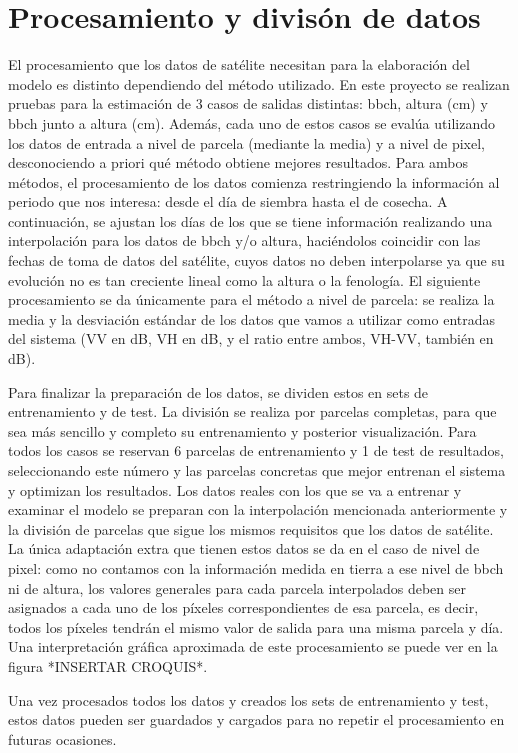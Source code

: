 \section{Procesamiento y divisón de datos}
\par  El procesamiento que los datos de satélite necesitan para la elaboración del modelo es distinto dependiendo del método utilizado. En este proyecto se realizan pruebas para la estimación de 3 casos de salidas distintas: \gls{bbch}, altura (cm) y \gls{bbch} junto a altura (cm). Además, cada uno de estos casos se evalúa utilizando los datos de entrada a nivel de parcela (mediante la media) y a nivel de pixel, desconociendo a priori qué método obtiene mejores resultados. Para ambos métodos, el procesamiento de los datos comienza restringiendo la información al periodo que nos interesa: desde el día de siembra hasta el de cosecha. A continuación, se ajustan los días de los que se tiene información realizando una interpolación para los datos de \gls{bbch} y/o altura, haciéndolos coincidir con las fechas de toma de datos del satélite, cuyos datos no deben interpolarse ya que su evolución no es tan creciente lineal como la altura o la fenología. El siguiente procesamiento se da únicamente para el método a nivel de parcela: se realiza la media y la desviación estándar de los datos que vamos a utilizar como entradas del sistema (VV en dB, VH en dB, y el ratio entre ambos, VH-VV, también en dB). 
\\
\par Para finalizar la preparación de los datos, se dividen estos en sets de entrenamiento y de test. La división se realiza por parcelas completas, para que sea más sencillo y completo su entrenamiento y posterior visualización. Para todos los casos se reservan 6 parcelas de entrenamiento y 1 de test de resultados, seleccionando este número y las parcelas concretas que mejor entrenan el sistema y optimizan los resultados. Los datos reales con los que se va a entrenar y examinar el modelo se preparan con la interpolación mencionada anteriormente y la división de parcelas que sigue los mismos requisitos que los datos de satélite. La única adaptación extra que tienen estos datos se da en el caso de nivel de pixel: como no contamos con la información medida en tierra a ese nivel de \gls{bbch} ni de altura, los valores generales para cada parcela interpolados deben ser asignados a cada uno de los píxeles correspondientes de esa parcela, es decir, todos los píxeles tendrán el mismo valor de salida para una misma parcela y día. Una interpretación gráfica aproximada de este procesamiento se puede ver en la figura *INSERTAR CROQUIS*.
\\
\par Una vez procesados todos los datos y creados los sets de entrenamiento y test, estos datos pueden ser guardados y cargados para no repetir el procesamiento en futuras ocasiones.
